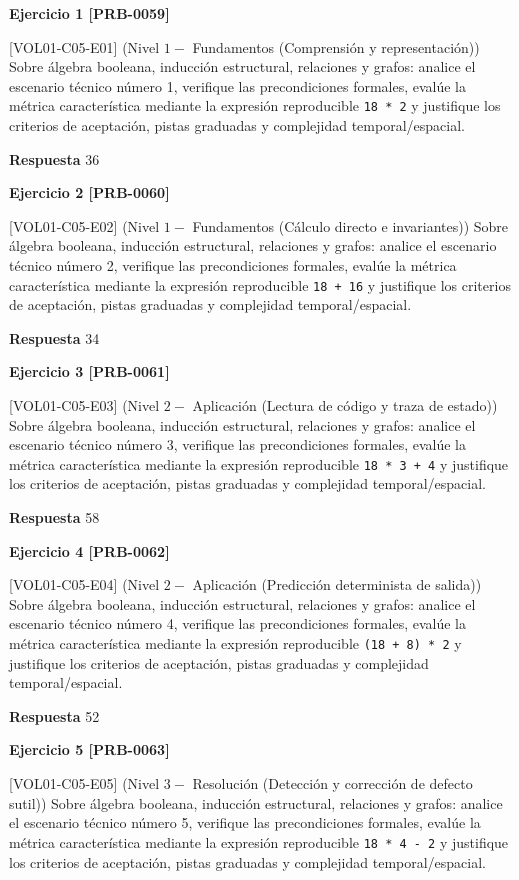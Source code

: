\documentclass{book}
\begin{document}
\noindent\textbf{Ejercicio 1 [PRB-0059]}

[VOL01-C05-E01] (Nivel \(1 -\) Fundamentos (Comprensión y representación)) Sobre álgebra booleana, inducción estructural, relaciones y grafos: analice el escenario técnico número 1, verifique las precondiciones formales, evalúe la métrica característica mediante la expresión reproducible \texttt{18 * 2} y justifique los criterios de aceptación, pistas graduadas y complejidad temporal/espacial.

\noindent\textbf{Respuesta} 36

\noindent\textbf{Ejercicio 2 [PRB-0060]}

[VOL01-C05-E02] (Nivel \(1 -\) Fundamentos (Cálculo directo e invariantes)) Sobre álgebra booleana, inducción estructural, relaciones y grafos: analice el escenario técnico número 2, verifique las precondiciones formales, evalúe la métrica característica mediante la expresión reproducible \texttt{18 + 16} y justifique los criterios de aceptación, pistas graduadas y complejidad temporal/espacial.

\noindent\textbf{Respuesta} 34

\noindent\textbf{Ejercicio 3 [PRB-0061]}

[VOL01-C05-E03] (Nivel \(2 -\) Aplicación (Lectura de código y traza de estado)) Sobre álgebra booleana, inducción estructural, relaciones y grafos: analice el escenario técnico número 3, verifique las precondiciones formales, evalúe la métrica característica mediante la expresión reproducible \texttt{18 * 3 + 4} y justifique los criterios de aceptación, pistas graduadas y complejidad temporal/espacial.

\noindent\textbf{Respuesta} 58

\noindent\textbf{Ejercicio 4 [PRB-0062]}

[VOL01-C05-E04] (Nivel \(2 -\) Aplicación (Predicción determinista de salida)) Sobre álgebra booleana, inducción estructural, relaciones y grafos: analice el escenario técnico número 4, verifique las precondiciones formales, evalúe la métrica característica mediante la expresión reproducible \texttt{(18 + 8) * 2} y justifique los criterios de aceptación, pistas graduadas y complejidad temporal/espacial.

\noindent\textbf{Respuesta} 52

\noindent\textbf{Ejercicio 5 [PRB-0063]}

[VOL01-C05-E05] (Nivel \(3 -\) Resolución (Detección y corrección de defecto sutil)) Sobre álgebra booleana, inducción estructural, relaciones y grafos: analice el escenario técnico número 5, verifique las precondiciones formales, evalúe la métrica característica mediante la expresión reproducible \texttt{18 * 4 - 2} y justifique los criterios de aceptación, pistas graduadas y complejidad temporal/espacial.
\end{document}

